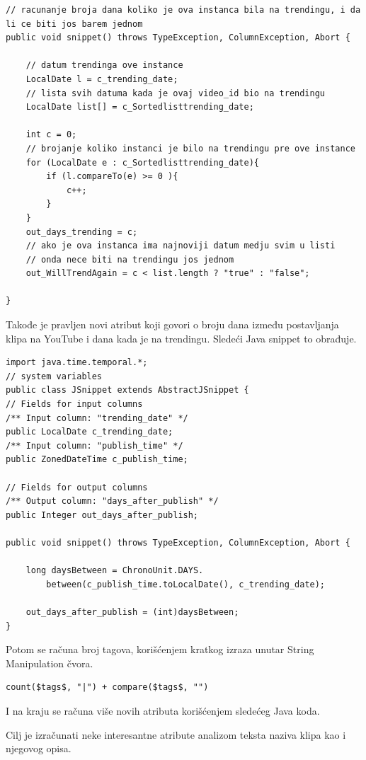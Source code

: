 \documentclass[a4paper]{article}
\theoremstyle{definition}
\begin{document}
\begin{lstlisting}
// racunanje broja dana koliko je ova instanca bila na trendingu, i da li ce biti jos barem jednom
public void snippet() throws TypeException, ColumnException, Abort {

	// datum trendinga ove instance
	LocalDate l = c_trending_date;
	// lista svih datuma kada je ovaj video_id bio na trendingu
	LocalDate list[] = c_Sortedlisttrending_date;

	int c = 0;
	// brojanje koliko instanci je bilo na trendingu pre ove instance
	for (LocalDate e : c_Sortedlisttrending_date){	
		if (l.compareTo(e) >= 0 ){
			c++;
		}
	}
	out_days_trending = c;
	// ako je ova instanca ima najnoviji datum medju svim u listi
	// onda nece biti na trendingu jos jednom
	out_WillTrendAgain = c < list.length ? "true" : "false";

}

\end{lstlisting}


Takođe je pravljen novi atribut koji govori o broju dana između postavljanja klipa na YouTube i dana kada je na trendingu.
Sledeći Java snippet to obrađuje.

\begin{lstlisting}
import java.time.temporal.*;
// system variables
public class JSnippet extends AbstractJSnippet {
// Fields for input columns
/** Input column: "trending_date" */
public LocalDate c_trending_date;
/** Input column: "publish_time" */
public ZonedDateTime c_publish_time;

// Fields for output columns
/** Output column: "days_after_publish" */
public Integer out_days_after_publish;

public void snippet() throws TypeException, ColumnException, Abort {

	long daysBetween = ChronoUnit.DAYS.
		between(c_publish_time.toLocalDate(), c_trending_date);

	out_days_after_publish = (int)daysBetween;	
}
\end{lstlisting}

Potom se računa broj tagova, korišćenjem kratkog izraza unutar String Manipulation čvora.

\begin{verbatim}
count($tags$, "|") + compare($tags$, "")
\end{verbatim}

I na kraju se računa više novih atributa korišćenjem sledećeg Java koda.

Cilj je izračunati neke interesantne atribute analizom teksta naziva klipa kao i njegovog opisa.
\end{document}

